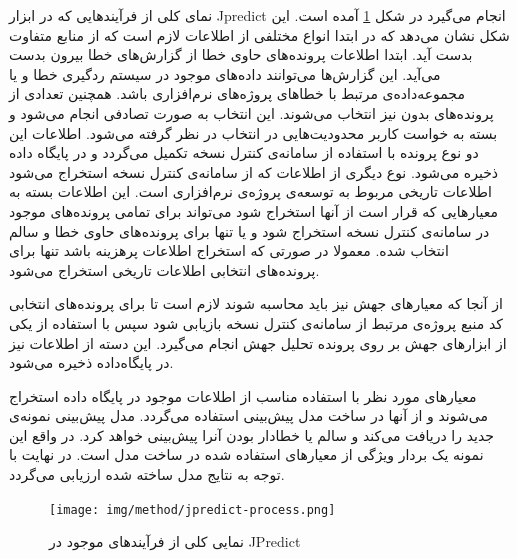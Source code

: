 نمای کلی از فرآیند‌هایی که در ابزار Jpredict انجام می‌گیرد در شکل \ref{fig:jpredict-process}  آمده است. این شکل نشان می‌دهد که در ابتدا انواع مختلفی از اطلاعات لازم است که از منابع متفاوت بدست آید. ابتدا اطلاعات پرونده‌های حاوی خطا از گزارش‌های خطا بیرون بدست می‌آید. این گزارش‌ها می‌توانند داده‌های موجود در سیستم ردگیری خطا و یا  مجموعه‌داده‌ی مرتبط با خطاهای پروژه‌های نرم‌افزاری باشد. همچنین تعدادی از پرونده‌های بدون نیز انتخاب می‌شوند. این انتخاب به صورت تصادفی انجام می‌شود و بسته به خواست کاربر محدودیت‌هایی در انتخاب در نظر گرفته می‌شود. اطلاعات این دو نوع پرونده با استفاده از سامانه‌ی کنترل نسخه تکمیل می‌گردد و در پایگاه داده ذخیره می‌شود. نوع دیگری از اطلاعات که از سامانه‌ی کنترل نسخه استخراج می‌شود اطلاعات تاریخی مربوط به توسعه‌ی پروژه‌ی نرم‌افزاری است. این اطلاعات بسته به معیارهایی که قرار است از آنها استخراج شود می‌تواند برای تمامی پرونده‌های موجود در سامانه‌ی کنترل نسخه استخراج شود و یا تنها برای پرونده‌های حاوی خطا و سالم انتخاب شده. معمولا در صورتی که استخراج اطلاعات پرهزینه باشد تنها برای پرونده‌های انتخابی اطلاعات تاریخی استخراج می‌شود. 

از آنجا که معیارهای جهش نیز باید محاسبه شوند لازم است تا برای پرونده‌های انتخابی کد منبع پروژه‌ی  مرتبط از سامانه‌ی کنترل نسخه بازیابی شود سپس با استفاده از یکی از ابزارهای جهش بر روی  پرونده تحلیل جهش انجام می‌گیرد. این دسته از اطلاعات  نیز در پایگاه‌داده ذخیره می‌شود. 

معیارهای مورد نظر با استفاده  مناسب از اطلاعات موجود در پایگاه داده استخراج می‌شوند و از آنها در ساخت مدل پیش‌بینی استفاده می‌گردد. مدل پیش‌بینی نمونه‌ی جدید را دریافت می‌کند و سالم یا خطادار بودن آنرا پیش‌بینی خواهد کرد. در واقع این نمونه یک بردار ویژگی از معیارهای استفاده شده در ساخت مدل است. در نهایت  با توجه به نتایج مدل ساخته شده ارزیابی می‌گردد.

\begin{figure}[H]
	\centering
	\texttt{[image: img/method/jpredict-process.png]}
	\caption{ نمایی کلی از فرآیند‌های موجود در JPredict}
	\label{fig:jpredict-process}
\end{figure}

